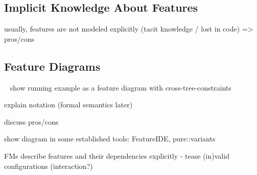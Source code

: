

\subsection{Implicit Knowledge About Features}

usually, features are not modeled explicitly (tacit knowledge / lost in code) => pros/cons








\subsection{Feature Diagrams} %

\begin{frame}{~}
show running example as a feature diagram with cross-tree-constraints

explain notation (formal semantics later)

discuss pros/cons

show diagram in some established tools: FeatureIDE, pure::variants

FMs describe features and their dependencies explicitly - tease (in)valid configurations (interaction?)
\end{frame}

